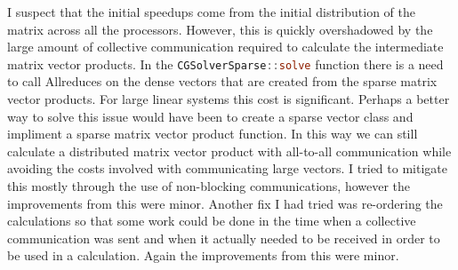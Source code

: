 I suspect that the initial speedups come from the initial distribution of the matrix across all the processors. However,
this is quickly overshadowed by the large amount of collective communication required to calculate the intermediate
matrix vector products. In the \lstinline[language=Julia]|CGSolverSparse::solve| function there is a need to call
Allreduces on the dense vectors that are created from the sparse matrix vector products. For large linear systems this
cost is significant. Perhaps a better way to solve this issue would have been to create a sparse vector class and
impliment a sparse matrix vector product function. In this way we can still calculate a distributed matrix vector
product with all-to-all communication while avoiding the costs involved with communicating large vectors. I tried to
mitigate this mostly through the use of non-blocking communications, however the improvements from this were minor.
Another fix I had tried was re-ordering the calculations so that some work could be done in the time when a collective
communication was sent and when it actually needed to be received in order to be used in a calculation. Again the
improvements from this were minor.